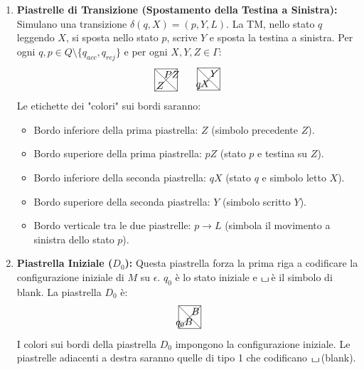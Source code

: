 \documentclass[a4paper]{article}
\theoremstyle{definition} %
\newcommand{\blankS}{\ensuremath{\raisebox{-0.15ex}{\scalebox{1.3}[0.7]{$\sqcup$}}\mkern2mu}}
\begin{document}
\begin{enumerate}
    \item \textbf{Piastrelle di Transizione (Spostamento della Testina a Sinistra):}
    Simulano una transizione $\delta(q, X) = (p, Y, L)$. La TM, nello stato $q$ leggendo $X$, si sposta nello stato $p$, scrive $Y$ e sposta la testina a sinistra.
    Per ogni $q, p \in Q \setminus \{q_{acc}, q_{rej}\}$ e per ogni $X, Y, Z \in \Gamma$:
    \[
    \begin{tikzpicture}[scale=0.8]
    \draw (0,0) -- (1,0) -- (1,1) -- (0,1) -- cycle;
    \draw (0,0) -- (1,1);
    \draw (1,0) -- (0,1);
    \node at (0.25, 0.75) {}; %
    \node at (0.75, 0.75) {$PZ$}; %
    \node at (0.25, 0.25) {$Z$}; %
    \node at (0.75, 0.25) {}; %
    \end{tikzpicture}
    \quad
    \begin{tikzpicture}[scale=0.8]
    \draw (0,0) -- (1,0) -- (1,1) -- (0,1) -- cycle;
    \draw (0,0) -- (1,1);
    \draw (1,0) -- (0,1);
    \node at (0.25, 0.75) {}; %
    \node at (0.75, 0.75) {$Y$}; %
    \node at (0.25, 0.25) {$qX$}; %
    \node at (0.75, 0.25) {}; %
    \end{tikzpicture}
    \]
    Le etichette dei "colori" sui bordi saranno:
    \begin{itemize}
        \item Bordo inferiore della prima piastrella: $Z$ (simbolo precedente $Z$).
        \item Bordo superiore della prima piastrella: $pZ$ (stato $p$ e testina su $Z$).
        \item Bordo inferiore della seconda piastrella: $qX$ (stato $q$ e simbolo letto $X$).
        \item Bordo superiore della seconda piastrella: $Y$ (simbolo scritto $Y$).
        \item Bordo verticale tra le due piastrelle: $p \to L$ (simbola il movimento a sinistra dello stato $p$).
    \end{itemize}

    \item \textbf{Piastrella Iniziale ($D_0$):}
    Questa piastrella forza la prima riga a codificare la configurazione iniziale di $M$ su $\epsilon$. $q_0$ è lo stato iniziale e \blankS è il simbolo di blank.
    La piastrella $D_0$ è:
    \[
    \begin{tikzpicture}[scale=0.8]
    \draw (0,0) -- (1,0) -- (1,1) -- (0,1) -- cycle;
    \draw (0,0) -- (1,1);
    \draw (1,0) -- (0,1);
    \node at (0.25, 0.75) {}; %
    \node at (0.75, 0.75) {$B$}; %
    \node at (0.25, 0.25) {$q_0B$}; %
    \node at (0.75, 0.25) {}; %
    \end{tikzpicture}
    \]
    I colori sui bordi della piastrella $D_0$ impongono la configurazione iniziale. Le piastrelle adiacenti a destra saranno quelle di tipo 1 che codificano \blankS (blank).
\end{enumerate}
\end{document}
